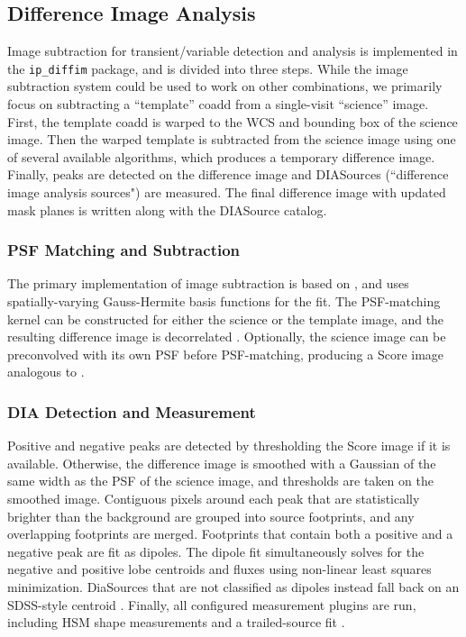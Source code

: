 \subsection{Difference Image Analysis}
\label{sec:dia}

Image subtraction for transient/variable detection and analysis is implemented in the \texttt{ip\_diffim} package, and is divided into three steps.
While the image subtraction system could be used to work on other combinations, we primarily focus on subtracting a ``template'' coadd from a single-visit ``science'' image.
First, the template coadd is warped to the WCS and bounding box of the science image.
Then the warped template is subtracted from the science image using one of several available algorithms, which produces a temporary difference image.
Finally, peaks are detected on the difference image and DIASources (``difference image analysis sources") are measured.
The final difference image with updated mask planes is written along with the DIASource catalog.

\subsubsection{PSF Matching and Subtraction}

The primary implementation of image subtraction is based on \citet{1998ApJ...503..325A}, and uses spatially-varying Gauss-Hermite basis functions for the fit.
The PSF-matching kernel can be constructed for either the science or the template image, and the resulting difference image is decorrelated \citet{DMTN-021}.
Optionally, the science image can be preconvolved with its own PSF before PSF-matching, producing a Score image analogous to \citet{2016ApJ...830...27Z}.

\subsubsection{DIA Detection and Measurement}
\label{sec:detectAndMeasureDiaSource}

Positive and negative peaks are detected by thresholding the Score image if it is available.
Otherwise, the difference image is smoothed with a Gaussian of the same width as the PSF of the science image, and thresholds are taken on the smoothed image.
Contiguous pixels around each peak that are statistically brighter than the background are grouped into source footprints, and any overlapping footprints are merged.
Footprints that contain both a positive and a negative peak are fit as dipoles.
The dipole fit simultaneously solves for the negative and positive lobe centroids and fluxes using non-linear least squares minimization.
DiaSources that are not classified as dipoles instead fall back on an SDSS-style centroid \citep{2003AJ....125.1559P}.
Finally, all configured measurement plugins are run, including HSM shape measurements  and a trailed-source fit .

